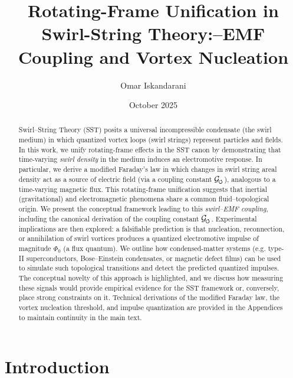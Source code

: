 \documentclass[12pt]{article}
\DeclareRobustCommand{\swirlarrow}{
\mathchoice{\mkern-2mu\scriptstyle\boldsymbol{\circlearrowleft}}%
{\mkern-2mu\scriptstyle\boldsymbol{\circlearrowleft}}%
{\mkern-2mu\scriptscriptstyle\boldsymbol{\circlearrowleft}}%
{\mkern-2mu\scriptscriptstyle\boldsymbol{\circlearrowleft}}
}%
\newcommand{\Gswirl}{\mathcal{G}_{\swirlarrow}}
\begin{document}
\title{Rotating-Frame Unification in Swirl-String Theory:\Swirl--EMF Coupling and Vortex Nucleation}
\author{Omar Iskandarani}
\date{October 2025}

\begin{abstract}

\noindent Swirl--String Theory (SST) posits a universal incompressible condensate (the swirl medium) in which quantized vortex loops (swirl strings) represent particles and fields. In this work, we unify rotating-frame effects in the SST canon by demonstrating that time-varying \emph{swirl density} in the medium induces an electromotive response. In particular, we derive a modified Faraday's law in which changes in swirl string areal density act as a source of electric field (via a coupling constant $\Gswirl$), analogous to a time-varying magnetic flux. This rotating-frame unification suggests that inertial (gravitational) and electromagnetic phenomena share a common fluid–topological origin. We present the conceptual framework leading to this \emph{swirl--EMF coupling}, including the canonical derivation of the coupling constant $\Gswirl$. Experimental implications are then explored: a falsifiable prediction is that nucleation, reconnection, or annihilation of swirl vortices produces a quantized electromotive impulse of magnitude $\Phi_{0}$ (a flux quantum). We outline how condensed-matter systems (e.g. type-II superconductors, Bose–Einstein condensates, or magnetic defect films) can be used to simulate such topological transitions and detect the predicted quantized impulses. The conceptual novelty of this approach is highlighted, and we discuss how measuring these signals would provide empirical evidence for the SST framework or, conversely, place strong constraints on it. Technical derivations of the modified Faraday law, the vortex nucleation threshold, and impulse quantization are provided in the Appendices to maintain continuity in the main text.

\end{abstract}


\section{Introduction}
\end{document}
